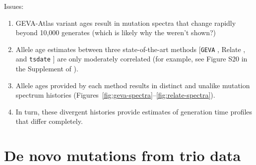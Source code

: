 \documentclass[]{article}
\begin{document}
Issues:
\begin{enumerate}
    \item GEVA-Atlas variant ages result in mutation spectra that change
        rapidly beyond 10,000 generates (which is likely why the weren't
        shown?)
    \item Allele age estimates between three state-of-the-art methods
        [\texttt{GEVA} \citep{albers2020dating}, Relate
        \citep{speidel2019method}, and \texttt{tsdate}
        \citep{wohns2022unified}] are only moderately correlated
        (for example, see Figure S20 in the Supplement of
        \citet{wohns2022unified}).
    \item Allele ages provided by each method results in distinct and
        unalike mutation spectrum histories
        (Figures~\ref{fig:geva-spectra}--\ref{fig:relate-spectra}).
    \item In turn, these divergent histories provide estimates of
        generation time profiles that differ completely.
\end{enumerate}

\section{De novo mutations from trio data}
\end{document}
